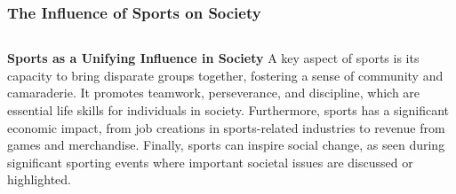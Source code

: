 \documentclass[5pt]{beamer}
\begin{document}
\begin{frame}
\frametitle{The Influence of Sports on Society}
\begin{columns}
\begin{column}{0.7\textwidth}
\begin{block}{\textbf{Sports as a Unifying Influence in Society}}
A key aspect of sports is its capacity to bring disparate groups together, fostering a sense of community and camaraderie. It promotes teamwork, perseverance, and discipline, which are essential life skills for individuals in society. Furthermore, sports has a significant economic impact, from job creations in sports-related industries to revenue from games and merchandise. Finally, sports can inspire social change, as seen during significant sporting events where important societal issues are discussed or highlighted.
\end{block}
\end{column}
\end{columns}
\end{frame}
\end{document}
